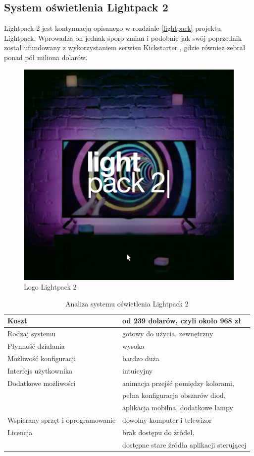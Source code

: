 \documentclass[12pt]{report}
\begin{document}
\vfill
\clearpage

\subsection{System oświetlenia Lightpack 2}

Lightpack 2 jest kontynuacją opisanego w rozdziale \ref{lightpack} projektu Lightpack. Wprowadza on jednak sporo zmian i podobnie jak swój poprzednik został ufundowany z wykorzystaniem serwisu Kickstarter \cite{lp2k}, gdzie również zebrał ponad pół miliona dolarów.

\begin{figure}[h]
\centering
\includegraphics[width=.5\textwidth]{../resources/lightpack2.jpg}
\caption[Logo Lightpack 2]{Logo Lightpack 2 \cite{lp2s}}
\end{figure}

\begin{table}[h]
\centering
\begin{tabular}{| l | l |} 
\hline 
Koszt & od 239 dolarów, czyli około 968 zł \\ \hline
Rodzaj systemu & gotowy do użycia, zewnętrzny \\ \hline
Płynność działania & wysoka \\ \hline
Możliwość konfiguracji & bardzo duża  \\ \hline
Interfejs użytkownika & intuicyjny  \\ \hline
Dodatkowe możliwości &  animacja przejść pomiędzy kolorami, \\ \hline
& pełna konfiguracja obszarów diod, \\ \hline
& aplikacja mobilna, dodatkowe lampy \\ \hline
Wspierany sprzęt i oprogramowanie &  dowolny komputer i telewizor   \\ \hline
Licencja & brak dostępu do źródeł,  \\ \hline
& dostępne stare źródła aplikacji sterującej \\ \hline
\end{tabular} 
\caption{Analiza systemu oświetlenia Lightpack 2}
\end{table}
\end{document}
